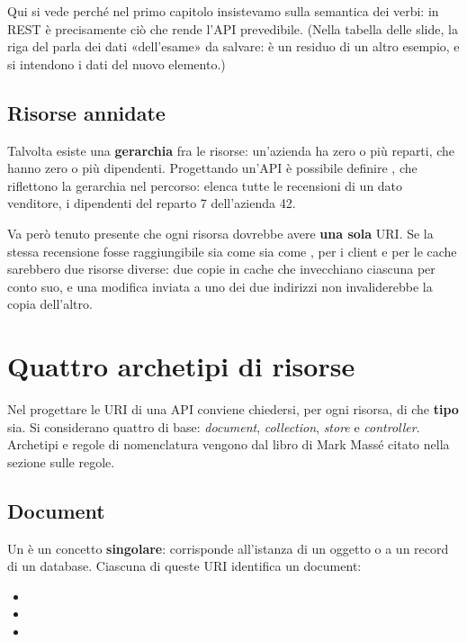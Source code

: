 Qui si vede perché nel primo capitolo insistevamo sulla semantica dei verbi:
in REST è precisamente ciò che rende l'API prevedibile. (Nella tabella delle
slide, la riga del  parla dei dati «dell'esame» da salvare: è un
residuo di un altro esempio, e si intendono i dati del nuovo elemento.)

\subsection{Risorse annidate}

Talvolta esiste una \textbf{gerarchia} fra le risorse: un'azienda ha zero o più
reparti, che hanno zero o più dipendenti. Progettando un'API è possibile
definire , che riflettono la gerarchia nel percorso:
 elenca tutte le recensioni di un dato
venditore,  i dipendenti del
reparto 7 dell'azienda 42.

Va però tenuto presente che ogni risorsa dovrebbe avere \textbf{una sola} URI.
Se la stessa recensione fosse raggiungibile sia come 
sia come , per i client e per le cache sarebbero due risorse
diverse: due copie in cache che invecchiano ciascuna per conto suo, e una
modifica inviata a uno dei due indirizzi non invaliderebbe la copia dell'altro.

\section{Quattro archetipi di risorse}

Nel progettare le URI di una API conviene chiedersi, per ogni risorsa, di che
\textbf{tipo} sia. Si considerano quattro  di base:
\textit{document}, \textit{collection}, \textit{store} e \textit{controller}.
Archetipi e regole di nomenclatura vengono dal libro di Mark Massé citato
nella sezione sulle regole.

\subsection{Document}

Un  è un concetto \textbf{singolare}: corrisponde all'istanza di
un oggetto o a un record di un database. Ciascuna di queste URI identifica un
document:

\begin{itemize}
  \item {}
  \item {}
  \item {}
\end{itemize}

